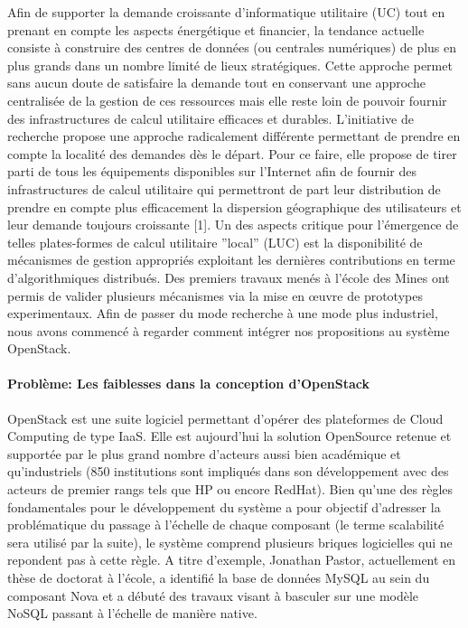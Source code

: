 \documentclass[a4paper,11pt]{article}
\begin{document}
\begin{note}
 Afin de supporter la demande croissante d'informatique utilitaire (UC) tout en prenant en compte les aspects énergétique et financier, la tendance actuelle consiste à construire des centres de données (ou centrales numériques) de plus en plus grands dans un nombre limité de lieux stratégiques. Cette approche permet sans aucun doute de satisfaire la demande tout en conservant une approche centralisée de la gestion de ces ressources mais elle reste loin de pouvoir fournir des infrastructures de calcul utilitaire efficaces et durables.
   L'initiative de recherche \discovery propose une approche radicalement différente permettant de prendre en compte la localité des demandes dès le départ.
Pour ce faire, elle propose de tirer parti de tous les équipements
disponibles sur l'Internet afin de fournir des infrastructures de calcul
utilitaire  qui permettront de part leur distribution de prendre en compte plus
efficacement la dispersion géographique des utilisateurs et leur demande
toujours croissante [1]. Un des aspects critique pour l'émergence de telles
plates-formes de calcul utilitaire ''local'' (LUC) est la disponibilité de
mécanismes de gestion appropriés exploitant les dernières
contributions en terme d'algorithmiques distribués.
Des premiers travaux menés à l'école des Mines ont permis de valider
plusieurs mécanismes via la mise en \oe uvre de prototypes
experimentaux.
Afin de passer du mode recherche à une mode plus industriel, nous
avons commencé à regarder comment intégrer nos propositions au système
OpenStack.

\paragraph*{Problème: Les faiblesses dans la conception d'OpenStack}

  OpenStack est une suite logiciel permettant d'opérer des plateformes
  de Cloud Computing de type IaaS. Elle est aujourd'hui la solution
  OpenSource retenue et supportée par le plus grand nombre d'acteurs
  aussi bien académique et qu'industriels (850 institutions sont
  impliqués dans son développement avec des acteurs de premier rangs
  tels que HP ou encore RedHat).
  Bien qu'une des règles fondamentales pour le développement du
  système a pour objectif d'adresser la problématique du passage à
  l'échelle de chaque composant (le terme scalabilité sera utilisé par
  la suite), le système comprend plusieurs briques
  logicielles qui ne repondent pas à
  cette règle. A titre d'exemple, Jonathan Pastor, actuellement en
  thèse de doctorat à l'école, a identifié la base de données MySQL au
  sein du composant Nova et a débuté des travaux visant à basculer sur
  une modèle NoSQL passant à l'échelle de manière native.


\end{note}
\end{document}
